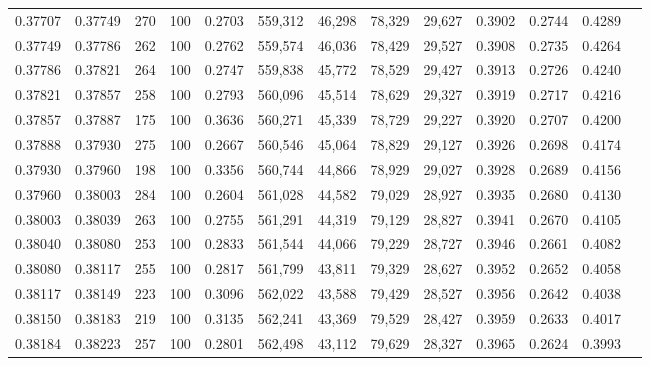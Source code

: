 \begin{tabular}{rrrrrrrrrrrrr}
0.37707 & 0.37749 &   270 & 100 &                                     0.2703 & 559,312 &  46,298 &  78,329 &  29,627 & 0.3902 & 0.2744 & 0.4289 \\
0.37749 & 0.37786 &   262 & 100 &                                     0.2762 & 559,574 &  46,036 &  78,429 &  29,527 & 0.3908 & 0.2735 & 0.4264 \\
0.37786 & 0.37821 &   264 & 100 &                                     0.2747 & 559,838 &  45,772 &  78,529 &  29,427 & 0.3913 & 0.2726 & 0.4240 \\
0.37821 & 0.37857 &   258 & 100 &                                     0.2793 & 560,096 &  45,514 &  78,629 &  29,327 & 0.3919 & 0.2717 & 0.4216 \\
0.37857 & 0.37887 &   175 & 100 &                                     0.3636 & 560,271 &  45,339 &  78,729 &  29,227 & 0.3920 & 0.2707 & 0.4200 \\
0.37888 & 0.37930 &   275 & 100 &                                     0.2667 & 560,546 &  45,064 &  78,829 &  29,127 & 0.3926 & 0.2698 & 0.4174 \\
0.37930 & 0.37960 &   198 & 100 &                                     0.3356 & 560,744 &  44,866 &  78,929 &  29,027 & 0.3928 & 0.2689 & 0.4156 \\
0.37960 & 0.38003 &   284 & 100 &                                     0.2604 & 561,028 &  44,582 &  79,029 &  28,927 & 0.3935 & 0.2680 & 0.4130 \\
0.38003 & 0.38039 &   263 & 100 &                                     0.2755 & 561,291 &  44,319 &  79,129 &  28,827 & 0.3941 & 0.2670 & 0.4105 \\
0.38040 & 0.38080 &   253 & 100 &                                     0.2833 & 561,544 &  44,066 &  79,229 &  28,727 & 0.3946 & 0.2661 & 0.4082 \\
0.38080 & 0.38117 &   255 & 100 &                                     0.2817 & 561,799 &  43,811 &  79,329 &  28,627 & 0.3952 & 0.2652 & 0.4058 \\
0.38117 & 0.38149 &   223 & 100 &                                     0.3096 & 562,022 &  43,588 &  79,429 &  28,527 & 0.3956 & 0.2642 & 0.4038 \\
0.38150 & 0.38183 &   219 & 100 &                                     0.3135 & 562,241 &  43,369 &  79,529 &  28,427 & 0.3959 & 0.2633 & 0.4017 \\
0.38184 & 0.38223 &   257 & 100 &                                     0.2801 & 562,498 &  43,112 &  79,629 &  28,327 & 0.3965 & 0.2624 & 0.3993 \\

\end{tabular}

